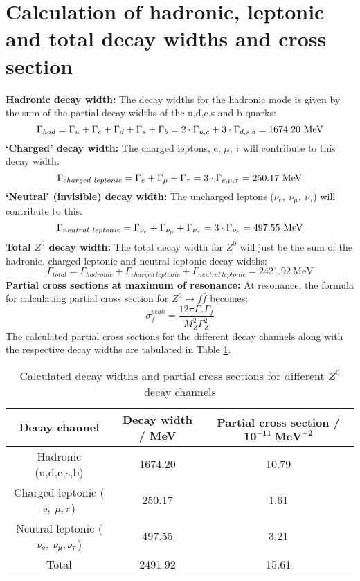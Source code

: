 \section{Calculation of hadronic, leptonic and total decay widths and cross section}
\textbf{Hadronic decay width:} The decay widths for the hadronic mode is given by the sum of the partial decay widths of the u,d,c,s and b quarks: $$\Gamma_{had}=\Gamma_{u}+\Gamma_{c}+\Gamma_{d}+\Gamma_{s}+\Gamma_{b}=2\cdot\Gamma_{u,c}+3\cdot\Gamma_{d,s,b}=1674.20\ \rm{MeV}$$
\textbf{`Charged' decay width:} The charged leptons, e, $\mu$, $\tau$ will contribute to this decay width: $$\Gamma_{charged \ leptonic}=\Gamma_{e}+\Gamma_{\mu}+\Gamma_{\tau}=3\cdot \Gamma_{e,\mu,\tau}=250.17\ \rm{MeV}$$
\textbf{`Neutral' (invisible) decay width:} The uncharged leptons ($\nu_{e}, \ \nu_{\mu}, \ \nu_{\tau}$) will contribute to this: $$\Gamma_{neutral \ leptonic}=\Gamma_{\nu_e}+\Gamma_{\nu_\mu}+\Gamma_{\nu_\tau}=3\cdot\Gamma_{\nu_e}=497.55 \ \rm{MeV}$$
\textbf{Total $Z^{0}$ decay width:} The total decay width for $Z^{0}$ will just be the sum of the hadronic, charged leptonic and neutral leptonic decay widths: $$\Gamma_{total}=\Gamma_{hadronic}+\Gamma_{charged \ leptonic}+\Gamma_{neutral \ leptonic}=2421.92 \ \mathrm{MeV}$$
\textbf{Partial cross sections at maximum of resonance:} At resonance, the formula for calculating partial cross section for $Z^{0}\rightarrow f\bar{f}$ becomes:
\begin{equation}
\sigma_{f}^{peak}=\dfrac{12\pi \Gamma_{e}\Gamma_{f}}{M_{Z}^{2}\Gamma_{Z}^{2}}
\end{equation}
The calculated partial cross sections for the different decay channels along with the respective decay widths are tabulated in Table \ref{totdecay}.

\begin{table}[h!]
\centering
\begin{tabular}{|c|c|c|}
\hline
\textbf{Decay channel} & \textbf{Decay width / MeV} & \textbf{Partial cross section / } $\mathbf{10^{-11}\ MeV^{-2}}$\\
\hline
Hadronic (u,d,c,s,b) & 1674.20 & 10.79\\
\hline
Charged leptonic ($\rm{e, \ \mu, \tau }$) & 250.17 & 1.61\\
\hline
Neutral leptonic ($\rm{\nu_{e}, \ \nu_{\mu}, \nu_{\tau} }$) & 497.55 & 3.21\\
\hline
Total & 2491.92 & 15.61\\
\hline
\end{tabular}
\caption{Calculated decay widths and partial cross sections for different $Z^{0}$ decay channels}
\label{totdecay}
\end{table}

